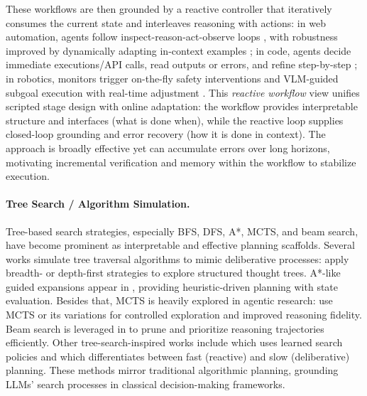 These workflows are then grounded by a reactive controller that iteratively consumes the current state and interleaves reasoning with actions: in web automation, agents follow inspect-reason-act-observe loops \cite{yao2023react,deng2023mind2web}, with robustness improved by dynamically adapting in-context examples \cite{lutz2024wilbur}; in code, agents decide immediate executions/API calls, read outputs or errors, and refine step-by-step \cite{wang2024executable,patil2024gorilla,shinn2023reflexion,gupta2024codenav,rahman2025marco,he2024enhancing,rawat2025pre,aksitov2023rest,jiang2024self}; in robotics, monitors trigger on-the-fly safety interventions and VLM-guided subgoal execution with real-time adjustment \cite{sinha2024real,shah2023lm}. This \emph{reactive workflow} view unifies scripted stage design with online adaptation: the workflow provides interpretable structure and interfaces (what is done when), while the reactive loop supplies closed-loop grounding and error recovery (how it is done in context). The approach is broadly effective yet can accumulate errors over long horizons, motivating incremental verification and memory within the workflow to stabilize execution.


\paragraph{Tree Search / Algorithm Simulation.} Tree-based search strategies, especially BFS, DFS, A*, MCTS, and beam search, have become prominent as interpretable and effective planning scaffolds. Several works simulate tree traversal algorithms to mimic deliberative processes: \cite{yao2023tree,markowitz2024tree,long2023large,koh2024tree} apply breadth- or depth-first strategies to explore structured thought trees. A*-like guided expansions appear in \cite{wang2024qstar,meng2024llmastar,liu2024multimodal}, providing heuristic-driven planning with state evaluation. Besides that, MCTS is heavily explored in agentic research: \cite{hao2023reasoning,putta2024agent,sprueill2023monte,yu2023prompt,zhao2023large,ding2023everything,chen2024tree,kong2024latent,feng2023alphazero,yoon2025monte,schultz2024mastering,chen2025broaden} use MCTS or its variations for controlled exploration and improved reasoning fidelity. Beam search is leveraged in \cite{xie2023self,golovneva2023pathfinder,qian2025discriminator} to prune and prioritize reasoning trajectories efficiently. Other tree-search-inspired works include \cite{gandhi2024stream} which uses learned search policies and \cite{saha2024system} which differentiates between fast (reactive) and slow (deliberative) planning. These methods mirror traditional algorithmic planning, grounding LLMs' search processes in classical decision-making frameworks.

